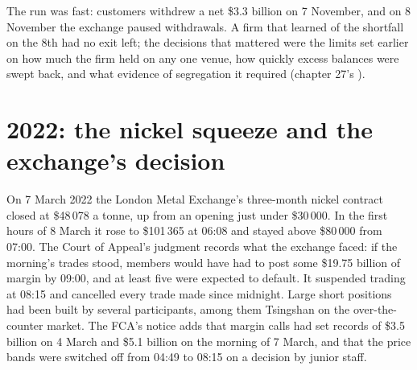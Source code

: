 \begin{omfigure}
\par
{}\label{fig:fm:case-studies-ii:ftx}
\end{omfigure}

The run was fast: customers withdrew a net \$3.3 billion on 7 November, and on 8 November the exchange paused withdrawals. A firm that learned of the
shortfall on the 8th had no exit left; the decisions that mattered were the limits set earlier on how much the firm held on any one venue, how
quickly excess balances were swept back, and what evidence of segregation it required (chapter 27's ).

\section{2022: the nickel squeeze and the exchange's decision}

On 7 March 2022 the London Metal Exchange's three-month nickel contract closed at \$48\,078 a tonne, up from an opening just under \$30\,000. In
the first hours of 8 March it rose to \$101\,365 at 06:08 and stayed above \$80\,000 from 07:00. The Court of Appeal's judgment records what the
exchange faced: if the morning's trades stood, members would have had to post some \$19.75 billion of margin by 09:00, and at least five were
expected to default. It suspended trading at 08:15 and cancelled every trade made since midnight. Large short positions had been built by several
participants, among them Tsingshan on the over-the-counter market. The FCA's notice adds that margin calls had set records of \$3.5 billion on 4
March and \$5.1 billion on the morning of 7 March, and that the price bands were switched off from 04:49 to 08:15 on a decision by junior staff.

